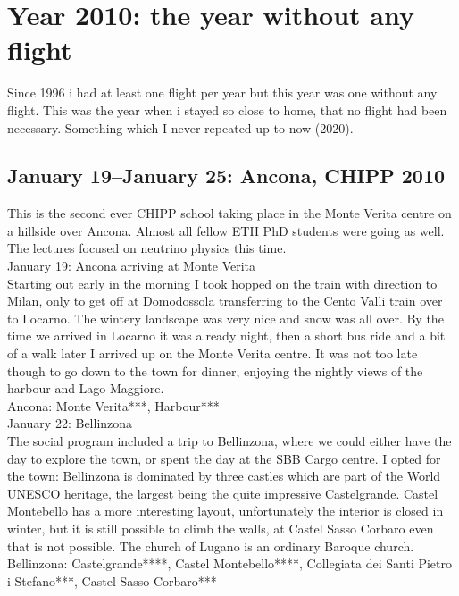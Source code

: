 \chapter{Year 2010: the year without any flight}
\label{2010}

Since 1996 i had at least one flight per year but this year was one without any flight. This was the year when i stayed so close to home, that no flight had been necessary. Something which I never repeated up to now (2020).

\section{January 19--January 25: Ancona, CHIPP 2010}
\label{Ancona2010}

This is the second ever CHIPP school taking place in the Monte Verita centre on a hillside over Ancona. Almost all fellow ETH PhD students were going as well. The lectures focused on neutrino physics this time.\\

January 19: Ancona arriving at Monte Verita\\
Starting out early in the morning I took hopped on the train with direction to Milan, only to get off at Domodossola transferring to the Cento Valli train over to Locarno. The wintery landscape was very nice and snow was all over. By the time we arrived in Locarno it was already night, then a short bus ride and a bit of a walk later I arrived up on the Monte Verita centre. It was not too late though to go down to the town for dinner, enjoying the nightly views of the harbour and Lago Maggiore.\\

Ancona: Monte Verita***, Harbour***\\

January 22: Bellinzona\\
The social program included a trip to Bellinzona, where we could either have the day to explore the town, or spent the day at the SBB Cargo centre. I opted for the town: Bellinzona is dominated by three castles which are part of the World UNESCO heritage, the largest being the quite impressive Castelgrande. Castel Montebello has a more interesting layout, unfortunately the interior is closed in winter, but it is still possible to climb the walls, at Castel Sasso Corbaro even that is not possible. The church of Lugano is an ordinary Baroque church.\\

Bellinzona: Castelgrande****, Castel Montebello****, Collegiata dei Santi Pietro i Stefano***, Castel Sasso Corbaro***\\

